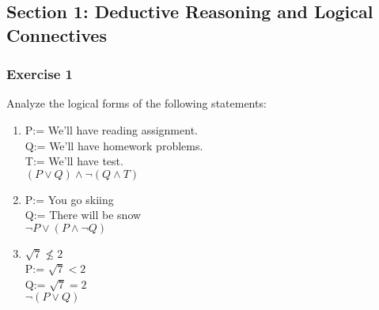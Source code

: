 \subsection{Section 1: Deductive Reasoning and Logical Connectives}

\begin{questions}

\subsubsection{Exercise 1}

\question Analyze the logical forms of the following statements:

\begin{solution}
    \begin{enumerate}[label=(\alph*)]
        \item P:= We'll have reading assignment. \;\\
                Q:= We'll have homework problems. \\
                T:= We'll have test. \\
                $(P \vee Q) \wedge \neg(Q \wedge T)$
                
        \item P:= You go skiing \\
                Q:= There will be snow \\
                $\neg P \vee (P \wedge \neg Q)$
        \item $\sqrt{7} \nleq 2$ \\
                P:= $\sqrt{7} < 2$ \\
                Q:= $\sqrt{7} = 2$ \\
                $\neg (P \vee Q)$
    \end{enumerate}
\end{solution}


\end{questions}

